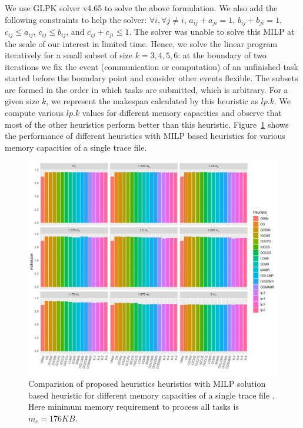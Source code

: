 \documentclass[runningheads]{llncs} %
\begin{document}
We use GLPK solver v4.65 to solve the above formulation. We also add the following constraints to help the solver: $\forall i, \forall j\ne i$, $a_{ij} + a_{ji}=1$, $b_{ij} + b_{ji} = 1$, $c_{ij} \le a_{ij}$, $c_{ij} \le b_{ij}$, and  $c_{ij} + c_{ji} \le 1$. The solver was unable to  solve this MILP at the scale of our interest in limited time. Hence, we solve the linear program iteratively for a small subset of size $k=3, 4, 5, 6$: at the boundary of two iterations we fix the event (communication or computation) of an unfinished task started before the boundary point and consider other events flexible. The subsets are formed in the order in which tasks are submitted, which is arbitrary. For a given size $k$, we represent the makespan calculated by this heuristic as $lp.k$. We compute various $lp.k$ values for different memory capacities and observe that most of the other heuristics perform better than this heuristic. Figure~\ref{fig:iterativeLpSolution} shows the performance of different heuristics with MILP based heuristics for various memory capacities of a single trace file.


			\begin{figure}[htb]
				\begin{center}
				\includegraphics[scale=0.5]{./makespan_with_lp.pdf}
				\caption{Comparision of proposed heuristics heuristics with MILP solution based heuristic for different memory capacities of a single trace file . Here  minimum memory requirement to process all tasks is $m_c=176KB$.}
				\label{fig:iterativeLpSolution}
				\end{center}
			\end{figure}
	
\end{document}

